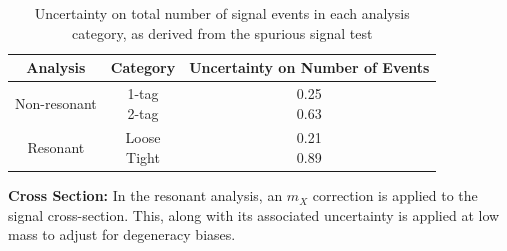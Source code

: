 \begin{table}[htbp]
  \centering
  \caption[Uncertainty on total number of signal events in each analysis category]{Uncertainty on total number of signal events in each analysis category, as derived from the spurious signal test}
  \label{tab:unc-sig-events}
  \begin{tabular}{c|c|c}
    Analysis & Category & Uncertainty on Number of Events \\
    \hline 
    Non-resonant &\makecell{1-tag\\2-tag} & \makecell{0.25\\0.63}\\
    \hline
    Resonant & \makecell{Loose\\Tight} & \makecell{0.21\\0.89}\\
  \end{tabular}
\end{table}

\noindent\textbf{Cross Section:} In the resonant analysis, an $m_X$ correction is applied to the signal cross-section. This, along with its associated uncertainty is applied at low mass to adjust for degeneracy biases. %


